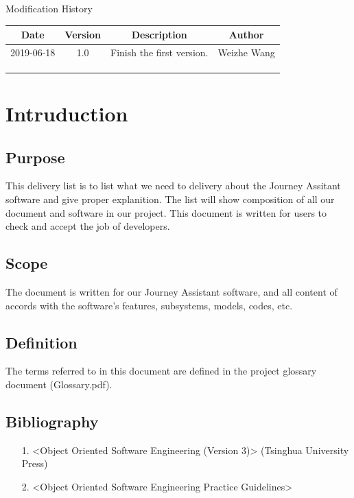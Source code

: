 \documentclass[10pt]{article}
\begin{document}
\newpage

\begin{center}
    {\LARGE Modification History}
    
    \begin{tabular}{|c|c|c|c|} 
        \hline 
        Date&Version&Description&Author\\
        \hline  
        2019-06-18&1.0&Finish the first version.&Weizhe Wang\\
		\hline 
		& & & \\
		\hline
		& & & \\
		\hline
		& & & \\
		\hline
    \end{tabular}    
\end{center}

\newpage

\tableofcontents
\newpage

\section{Intruduction}
\subsection{Purpose}
This delivery list is to list what we need to delivery about the Journey Assitant software and give proper explanition. The list will show composition of all our document and software in our project. This document is written for users to check and accept the job of developers.

\subsection{Scope}
The document is written for our Journey Assistant software, and all content of accords with the software's features, subsystems, models, codes, etc.

\subsection{Definition}
The terms referred to in this document are defined in the project glossary document (Glossary.pdf).

\subsection{Bibliography}
\begin{itemize}
	\item[1.] <Object Oriented Software Engineering (Version 3)> (Tsinghua University Press)
	\item[2.] <Object Oriented Software Engineering Practice Guidelines> 
\end{itemize}
\end{document}

